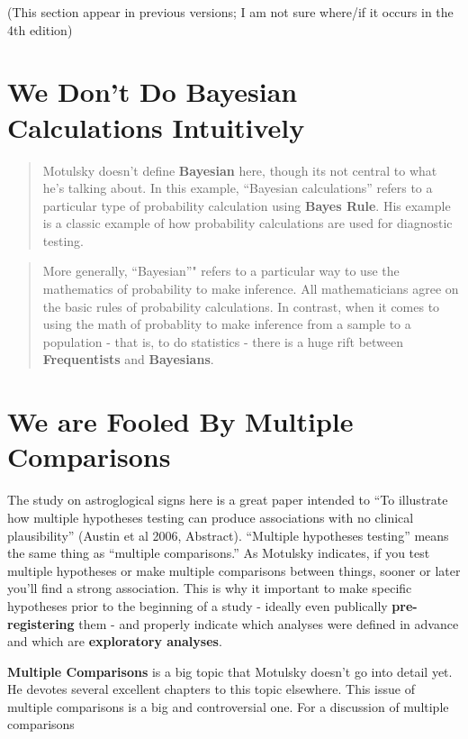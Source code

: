 \documentclass[]{book}
\theoremstyle{definition}
\theoremstyle{definition}
\theoremstyle{definition}
\theoremstyle{remark}
\begin{document}
(This section appear in previous versions; I am not sure where/if it
occurs in the 4th edition)

\section{We Don't Do Bayesian Calculations
Intuitively}\label{we-dont-do-bayesian-calculations-intuitively}

\begin{quote}
Motulsky doesn't define \textbf{Bayesian} here, though its not central
to what he's talking about. In this example, ``Bayesian calculations''
refers to a particular type of probability calculation using
\textbf{Bayes Rule}. His example is a classic example of how probability
calculations are used for diagnostic testing.
\end{quote}

\begin{quote}
More generally, ``Bayesian''" refers to a particular way to use the
mathematics of probability to make inference. All mathematicians agree
on the basic rules of probability calculations. In contrast, when it
comes to using the math of probablity to make inference from a sample to
a population - that is, to do statistics - there is a huge rift between
\textbf{Frequentists} and \textbf{Bayesians}.
\end{quote}

\section{We are Fooled By Multiple
Comparisons}\label{we-are-fooled-by-multiple-comparisons}

The study on astroglogical signs here is a great paper intended to ``To
illustrate how multiple hypotheses testing can produce associations with
no clinical plausibility'' (Austin et al 2006, Abstract). ``Multiple
hypotheses testing'' means the same thing as ``multiple comparisons.''
As Motulsky indicates, if you test multiple hypotheses or make multiple
comparisons between things, sooner or later you'll find a strong
association. This is why it important to make specific hypotheses prior
to the beginning of a study - ideally even publically
\textbf{pre-registering} them - and properly indicate which analyses
were defined in advance and which are \textbf{exploratory analyses}.

\textbf{Multiple Comparisons} is a big topic that Motulsky doesn't go
into detail yet. He devotes several excellent chapters to this topic
elsewhere. This issue of multiple comparisons is a big and controversial
one. For a discussion of multiple comparisons
\end{document}
